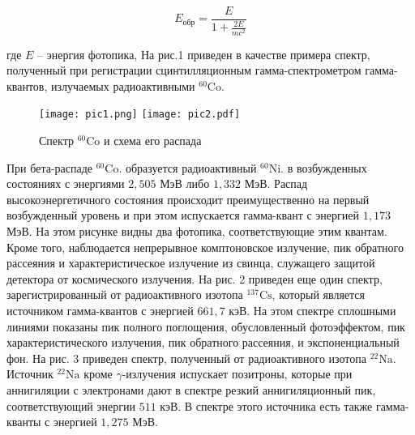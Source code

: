 \begin{equation}
  E_{\text{обр}} = \frac{E}{1 + \frac{2 E}{m c^2}}
\end{equation}

где $E$ – энергия фотопика, На рис.1 приведен в качестве примера спектр,
полученный при регистрации сцинтилляционным гамма-спектрометром гамма-квантов,
излучаемых радиоактивными ${}^{60}{\text{Co}}$.

\begin{figure}[h!]
  \centering
  \texttt{[image: pic1.png]}
  \texttt{[image: pic2.pdf]}
  \caption{Спектр ${}^{60}{\text{Co}}$ и схема его распада}
  \label{pic:Cobalt}
\end{figure}

При бета-распаде ${}^{60}{\text{Co}}$. образуется радиоактивный
${}^{60}{\text{Ni}}$. в возбужденных состояниях с энергиями $2,505$ МэВ либо
$1,332$ МэВ. Распад высокоэнергетичного состояния происходит преимущественно на
первый возбужденный уровень и при этом испускается гамма-квант с энергией
$1,173$ МэВ. На этом рисунке видны два фотопика, соответствующие этим квантам.
Кроме того, наблюдается непрерывное комптоновское излучение, пик обратного
рассеяния и характеристическое излучение из свинца, служащего защитой детектора
от космического излучения. На рис. 2 приведен еще один спектр,
зарегистрированный от радиоактивного изотопа ${}^{137}{\text{Cs}}$, который
является источником гамма-квантов с энергией $661,7$ кэВ. На этом спектре
сплошными линиями показаны пик полного поглощения, обусловленный фотоэффектом,
пик характеристического излучения, пик обратного рассеяния, и экспоненциальный
фон. На рис. 3 приведен спектр, полученный от радиоактивного изотопа
${}^{22}{\text{Na}}$. Источник ${}^{22}{\text{Na}}$ кроме $\gamma$-излучения
испускает позитроны, которые при аннигиляции с электронами дают в спектре резкий
аннигиляционный пик, соответствующий энергии $511$ кэВ. В спектре этого
источника есть также гамма-кванты с энергией $1,275$ МэВ.
